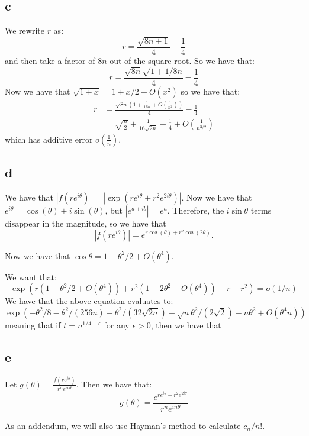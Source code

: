\documentclass[]{article}
\begin{document}
\subsection{c}
We rewrite $r$ as:
\begin{equation}
	r = \frac{\sqrt{8n + 1}}{4} - \frac{1}{4}
\end{equation}
and then take a factor of $8n$ out of the square root. So we have that:
\begin{equation}
	r = \frac{\sqrt{8n}\sqrt{1+ 1/8n}}{4} - \frac{1}{4}
\end{equation}
Now we have that $\sqrt{1 + x} = 1 + x/2 + O(x^2)$ so we have that:
\begin{align*}
	r &= \frac{\sqrt{8n}\left(1 + \frac{1}{16n} + O(\frac{1}{n^2})\right)}{4} - \frac{1}{4}\\
	&= \sqrt{\frac{n}{2}} + \frac{1}{16 \sqrt{2 n}} - \frac{1}{4} + O(\frac{1}{n^{3/2}})
\end{align*}
which has additive error $o(\frac{1}{n})$. 

\subsection{d}
We have that $|f(r e^{i \theta})| = |\exp\left(r e^{i \theta} + r^2 e^{2 i \theta}\right)|$. Now we have that $e^{i \theta} = \cos(\theta) + i \sin (\theta)$, but $|e^{a + ib}| = e^a$. Therefore, the $i \sin \theta$ terms disappear in the magnitude, so we have that 
\begin{equation}
	|f(r e^{i \theta})| = e^{r \cos (\theta) + r^2 \cos (2 \theta)}. 
\end{equation}

Now we have that $\cos \theta = 1 - \theta^2/2 + O(\theta^4)$. 

We want that:
\begin{equation}
	\exp(r (1 - \theta^2/2 + O(\theta^4)) + r^2 (1 - 2 \theta^2 + O(\theta^4)) - r - r^2) = o(1/n)
\end{equation}
We have that the above equation evaluates to:
\begin{equation}
	\exp(
	-\theta^2/8 - \theta^2/(256n) + \theta^2/(32 \sqrt{2n}) + \sqrt{n} \theta^2/(2 \sqrt{2}) - n \theta^2 + O(\theta^4 n)
	)
\end{equation}
meaning that if $t = n^{1/4 - \epsilon}$ for any $\epsilon > 0$, then we have that 

\subsection{e}

Let $g(\theta) = \frac{f(r e^{i \theta})}{r^n e^{i n \theta}}$. Then we have that:
\begin{equation}
	g(\theta) = \frac{ e^{r e^{i \theta} + r^2 e^{2 i \theta}}}{r^n e^{i n \theta}}
\end{equation}



As an addendum, we will also use Hayman's method to calculate $c_n/n!$. 
\end{document}
